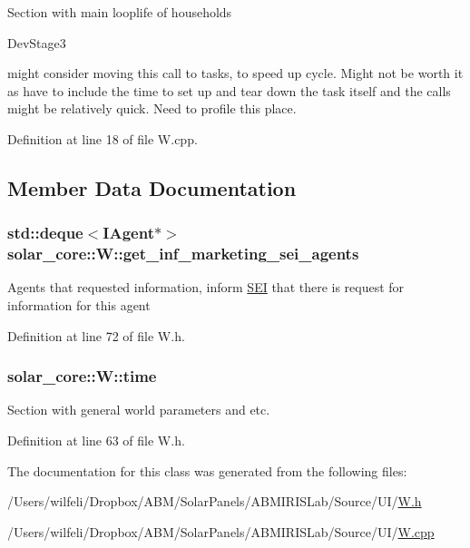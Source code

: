 Section with main looplife of households \begin{DoxyRefDesc}{Dev\+Stage3}
\item[\hyperlink{_dev_stage3__DevStage3000005}{Dev\+Stage3}]might consider moving this call to tasks, to speed up cycle. Might not be worth it as have to include the time to set up and tear down the task itself and the calls might be relatively quick. Need to profile this place. \end{DoxyRefDesc}


Definition at line 18 of file W.\+cpp.



\subsection{Member Data Documentation}
\hypertarget{classsolar__core_1_1_w_a81b5469757f203c9619ff69323ac0f77}{}
\subsubsection[{get\+\_\+inf\+\_\+marketing\+\_\+sei\+\_\+agents}]{\setlength{\rightskip}{0pt plus 5cm}std\+::deque$<${\bf I\+Agent}$\ast$$>$ solar\+\_\+core\+::\+W\+::get\+\_\+inf\+\_\+marketing\+\_\+sei\+\_\+agents\hspace{0.3cm}{\ttfamily [protected]}}\label{classsolar__core_1_1_w_a81b5469757f203c9619ff69323ac0f77}
Agents that requested information, inform \hyperlink{classsolar__core_1_1_s_e_i}{S\+E\+I} that there is request for information for this agent 

Definition at line 72 of file W.\+h.

\hypertarget{classsolar__core_1_1_w_ae96b30122adc9fae8fc2f209a4c89b0a}{}
\subsubsection[{time}]{ solar\+\_\+core\+::\+W\+::time}\label{classsolar__core_1_1_w_ae96b30122adc9fae8fc2f209a4c89b0a}
Section with general world parameters and etc. 

Definition at line 63 of file W.\+h.



The documentation for this class was generated from the following files\+:\begin{DoxyCompactItemize}
\item 
/\+Users/wilfeli/\+Dropbox/\+A\+B\+M/\+Solar\+Panels/\+A\+B\+M\+I\+R\+I\+S\+Lab/\+Source/\+U\+I/\hyperlink{_w_8h}{W.\+h}\item 
/\+Users/wilfeli/\+Dropbox/\+A\+B\+M/\+Solar\+Panels/\+A\+B\+M\+I\+R\+I\+S\+Lab/\+Source/\+U\+I/\hyperlink{_w_8cpp}{W.\+cpp}\end{DoxyCompactItemize}
